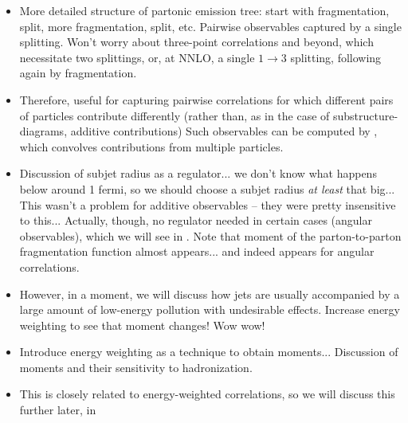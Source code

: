 \iffalse
\sam{Mention jet calculus \cite{Konishi:1978dg,Konishi:1978yx,Konishi:1978ks} and relation -- Jet calculus is a framework for calculating jet observables in perturbative QCD \cite{Caneschi:1978se,Jones:1979xj,Konishi:1979zp,Konishi:1979cb,Kirschner:1979im,Willen:1979ae,Kirschner:1979zh,Giovannini:1979ui,Kirschner:1979fm,Sukhatme:1980vs,Puhala:1980ms,Kalinowski:1980ju,Marchesini:1980cr,Kalinowski:1980wea,Jones:1981yr,Migneron:1981fw,Konishi:1981ea,Shelest:1982dg,Bertolini:1982em,Jones:1982bi,Jones:1982uf,Jones:1982ik,Jones:1983aa,Gunion:1984xw,Jones:1984zr,Szymanowski:1985vf,Gunion:1985pg,Gunion:1985sh,Jones:1985vb,Lassila:1986ay,Malaza:1986mi,Martin:1986uq,Camici:1998bg,Dremin:2002tw,Tanaka:2003ck,Dremin:2003dy,Ceccopieri:2007th,Trentadue:2007zza,Tanaka:2008kp,Tanaka:2011ig,Banfi:2021xzn,vanBeekveld:2023lsa}.}
\fi

\fi



\iffalse
\begin{itemize}
    \item
More detailed structure of partonic emission tree:
%
start with fragmentation, split, more fragmentation, split, etc.
%
Pairwise observables captured by a single splitting.
%
Won't worry about three-point correlations and beyond, which necessitate two splittings, or, at NNLO, a single \(1 \to 3\) splitting, following again by fragmentation.

    \item
Therefore, useful for capturing pairwise correlations for which different pairs of particles contribute differently (rather than, as in the case of \glspl{substructure-diagram}, additive contributions)
%
Such observables can be computed by , which convolves contributions from multiple particles.
%

    \item
Discussion of subjet radius as a regulator... we don't know what happens below around 1 fermi, so we should choose a subjet radius \textit{at least} that big...
%
This wasn't a problem for additive observables -- they were pretty insensitive to this...
%
Actually, though, no regulator needed in certain cases (angular observables), which we will see in \Sec{}.
%
Note that moment of the parton-to-parton fragmentation function almost appears...
%
and indeed appears for angular correlations.

    \item
However, in a moment, we will discuss how jets are usually accompanied by a large amount of low-energy pollution with undesirable effects.
%
Increase energy weighting to see that moment changes!
%
Wow wow!

    \item
Introduce energy weighting as a technique to obtain moments...
%
Discussion of moments and their sensitivity to hadronization.
%

    \item
This is closely related to energy-weighted correlations, so we will discuss this further later, in 
\end{itemize}


